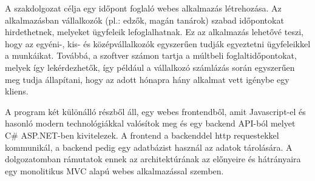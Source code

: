 A szakdolgozat célja egy időpont foglaló webes alkalmazás létrehozása. Az alkalmazásban vállalkozók (pl.: edzők, magán tanárok) szabad időpontokat hirdethetnek, melyeket ügyfeleik lefoglalhatnak. Ez az alkalmazás lehetővé teszi, hogy az egyéni-, kis- és középvállalkozók egyszerűen tudják egyeztetni ügyfeleikkel a munkáikat. Továbbá, a szoftver számon tartja a múltbeli foglaltidőpontokat, melyek így lekérdezhetők, így például a vállalkozó számlázás során egyszerűen meg tudja állapítani, hogy az adott hónapra hány alkalmat vett igénybe egy kliens.

A program két különálló részből áll, egy webes frontendből, amit Javascript-el és hasonló modern technológiákkal valósítok meg és egy backend API-ból melyet C\# ASP.NET-ben kivitelezek. A frontend a backenddel http requestekkel kommunikál, a backend pedig egy adatbázist használ az adatok tárolására. A dolgozatomban rámutatok ennek az architektúrának az előnyeire és hátrányaira egy monolitikus MVC alapú webes alkalmazással szemben.